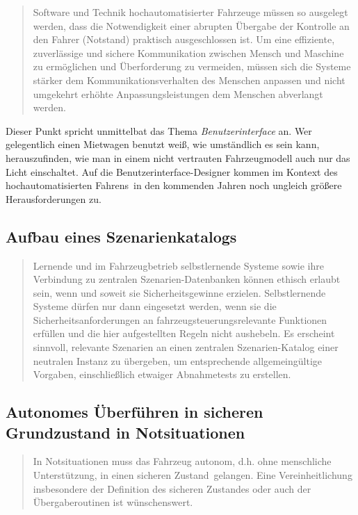\documentclass[twoside,a4paper,12pt]{article}
\begin{document}
\begin{quote}
\glqq
Software und Technik hochautomatisierter Fahrzeuge müssen so ausgelegt werden, dass
die Notwendigkeit einer abrupten Übergabe der Kontrolle an den Fahrer (\glqq Notstand\grqq)
praktisch ausgeschlossen ist. Um eine effiziente, zuverlässige und sichere Kommunikation zwischen Mensch und Maschine zu 
ermöglichen und Überforderung zu vermeiden,
müssen sich die Systeme stärker dem Kommunikationsverhalten des Menschen anpassen
und nicht umgekehrt erhöhte Anpassungsleistungen dem Menschen abverlangt werden.\grqq\mbox{~\cite[S. 13]{ek}}
\end{quote}

Dieser Punkt spricht unmittelbat das Thema \textit{Benutzerinterface} an. Wer gelegentlich einen Mietwagen benutzt weiß, wie 
umständlich es sein kann, herauszufinden, wie man in einem nicht vertrauten Fahrzeugmodell auch nur das Licht einschaltet. Auf die
Benutzerinterface-Designer kommen im Kontext des \glqq hochautomatisierten Fahrens\grqq\ in den kommenden Jahren noch ungleich größere
Herausforderungen zu. 

\subsection{Aufbau eines Szenarienkatalogs} \label{AufbauEinesSzenarienkatalogs}

\begin{quote}
\glqq
Lernende und im Fahrzeugbetrieb selbstlernende Systeme sowie ihre Verbindung zu zentralen Szenarien-Datenbanken 
können ethisch erlaubt sein, wenn und soweit sie Sicherheitsgewinne erzielen. Selbstlernende Systeme dürfen nur dann eingesetzt werden, wenn
sie die Sicherheitsanforderungen an fahrzeugsteuerungsrelevante Funktionen erfüllen
und die hier aufgestellten Regeln nicht aushebeln. Es erscheint sinnvoll, relevante Szenarien an einen zentralen 
Szenarien-Katalog einer neutralen Instanz zu übergeben, um
entsprechende allgemeingültige Vorgaben, einschließlich etwaiger Abnahmetests zu erstellen.\grqq\mbox{~\cite[S. 13]{ek}}
\end{quote}



\subsection{Autonomes Überführen in sicheren Grundzustand in Notsituationen} \label{AutonomesUeberfuehrenInSicherenGrundzustandInNotsituationen}

\begin{quote}
\glqq
In Notsituationen muss das Fahrzeug autonom, d.h. ohne menschliche Unterstützung, in
einen \glqq sicheren Zustand\grqq\ gelangen. Eine Vereinheitlichung insbesondere der Definition
des sicheren Zustandes oder auch der Übergaberoutinen ist wünschenswert.\grqq\mbox{~\cite[S. 13]{ek}}
\end{quote}
\end{document}
